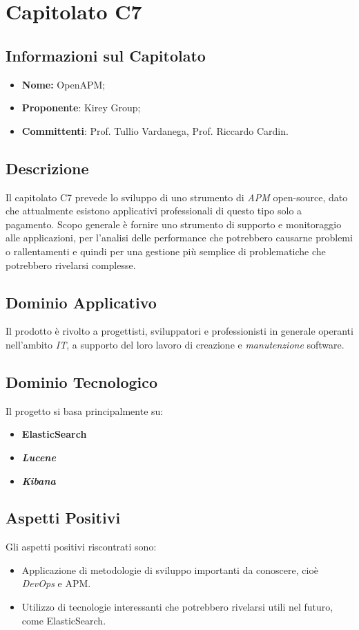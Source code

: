 \section{Capitolato C7}
\subsection{Informazioni sul Capitolato}
	\begin{itemize}
		\item \textbf{Nome:}
		OpenAPM;
		\item \textbf{Proponente}:
		Kirey Group;
		\item \textbf{Committenti}:
		Prof. Tullio Vardanega, Prof. Riccardo Cardin.
	\end{itemize}

\subsection{Descrizione}
	Il capitolato C7 prevede lo sviluppo di uno strumento di \textit{APM} open-source, dato che attualmente esistono applicativi professionali di questo tipo solo a pagamento. Scopo generale è fornire uno strumento di supporto e monitoraggio alle applicazioni, per l'analisi delle performance che potrebbero causarne problemi o rallentamenti e quindi per una gestione più semplice di problematiche che potrebbero rivelarsi complesse.
		
\subsection{Dominio Applicativo}
	Il prodotto è rivolto a progettisti, sviluppatori e professionisti in generale operanti nell'ambito \textit{IT}, a supporto del loro lavoro di creazione e \textit{manutenzione} software. 

\subsection{Dominio Tecnologico}
	Il progetto si basa principalmente su:
		\begin{itemize}
			\item \textbf{ElasticSearch}
			\item \textit{\textbf{Lucene}}
			\item \textit{\textbf{Kibana}}
		\end{itemize}

\subsection{Aspetti Positivi}
	Gli aspetti positivi riscontrati sono:
	\begin{itemize}
	\item Applicazione di metodologie di sviluppo importanti da conoscere, cioè \textit{DevOps} e APM.
	\item Utilizzo di tecnologie interessanti che potrebbero rivelarsi utili nel futuro, come ElasticSearch.
	\end{itemize}

